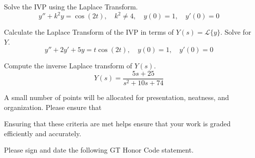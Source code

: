 \documentclass[12pt]{exam}
\begin{document}
    


\newpage

\begin{questions}




    \newpage
    \question[10] Solve the IVP using the Laplace Transform. $$y'' +k^2y = \cos(2t), \quad k^2 \ne 4, \quad y(0) = 1, \quad y'(0) = 0
    $$ %
    
    \newpage 
    \question[5] Calculate the Laplace Transform of the IVP in terms of $Y(s) = \mathcal{L}\{y\}$. Solve for $Y$. $$y''+2y'+5y = t\cos(2t), \quad y(0) = 1, \quad y'(0) = 0$$
    
    
    \newpage 
    \question[4] Compute the inverse Laplace transform of $Y(s)$. $$Y(s) = \frac{5s+25}{s^2+10s+74}$$ %

    \newpage 
    \question[1] A small number of points will be allocated for presentation, neatness, and organization. Please ensure that
    Ensuring that these criteria are met helps ensure that your work is graded efficiently and accurately. 

\end{questions}

   Please sign and date the following GT Honor Code statement. \\ 
    
\end{document}
